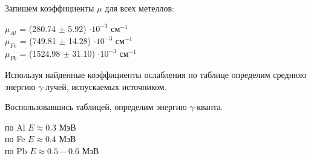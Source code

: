     Запишем коэффициенты $\mu$ для всех метеллов:

    \begin{center}
        $\mu_{Al}$ = (280.74 $\pm$ 5.92) $\cdot 10^{-3}$ см$^{-1}$ \\
        $\mu_{Fe}$ = (749.81 $\pm$ 14.28) $\cdot 10^{-3}$ см$^{-1}$ \\
        $\mu_{Pb}$ = (1524.98 $\pm$ 31.10) $\cdot 10^{-3}$ см$^{-1}$ \\
    \end{center}

    Используя найденные коэффициенты ослабления по таблице определим среднюю энергию
    $\gamma$-лучей, испускаемых источником.

    Воспользовавшись таблицей, определим энергию $\gamma$-кванта.

    \begin{center}
        по Al $E \approx 0.3$ МэВ \\
        по Fe $E \approx 0.4$ МэВ \\
        по Pb $E \approx 0.5 - 0.6$ МэВ \\
    \end{center}

